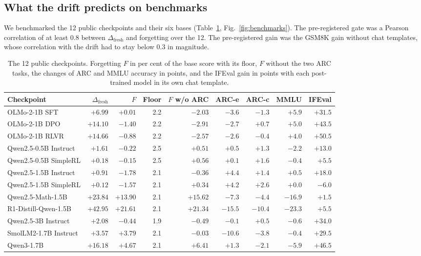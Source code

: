 \documentclass[11pt,a4paper]{article}
\theoremstyle{definition}
\newcommand{\dfresh}{\Delta_{\mathrm{fresh}}}
\begin{document}
\subsection{What the drift predicts on benchmarks}
\label{sec:benchmarks}

We benchmarked the 12 public checkpoints and their six bases (Table~\ref{tab:benchmarks},
Fig.~\ref{fig:benchmarks}). The pre-registered gate was a Pearson correlation of at least 0.8 between $\dfresh$
and forgetting over the 12. The pre-registered gain was the GSM8K gain without chat templates, whose correlation
with the drift had to stay below 0.3 in magnitude.

\begin{table}[ht]
\centering\small
\caption{The 12 public checkpoints. Forgetting $F$ in per cent of the base score with its floor, $F$ without the
two ARC tasks, the changes of ARC and MMLU accuracy in points, and the IFEval gain in points with each
post-trained model in its own chat template.}
\label{tab:benchmarks}
\begin{tabular}{@{}l r r r r r r r r@{}}
\toprule
Checkpoint & $\dfresh$ & $F$ & Floor & $F$ w/o ARC & ARC-e & ARC-c & MMLU & IFEval \\
\midrule
OLMo-2-1B SFT & $+6.99$ & $+0.01$ & 2.2 & $-2.03$ & $-3.6$ & $-1.3$ & $+5.9$ & $+31.5$ \\
OLMo-2-1B DPO & $+14.10$ & $-1.40$ & 2.2 & $-2.91$ & $-2.7$ & $+0.7$ & $+5.0$ & $+43.5$ \\
OLMo-2-1B RLVR & $+14.66$ & $-0.88$ & 2.2 & $-2.57$ & $-2.6$ & $-0.4$ & $+4.0$ & $+50.5$ \\
Qwen2.5-0.5B Instruct & $+1.61$ & $-0.22$ & 2.5 & $+0.51$ & $+0.5$ & $+1.3$ & $-2.2$ & $+13.0$ \\
Qwen2.5-0.5B SimpleRL & $+0.18$ & $-0.15$ & 2.5 & $+0.56$ & $+0.1$ & $+1.6$ & $-0.4$ & $+5.5$ \\
Qwen2.5-1.5B Instruct & $+0.91$ & $-1.78$ & 2.1 & $-0.36$ & $+4.4$ & $+1.4$ & $+0.5$ & $+18.0$ \\
Qwen2.5-1.5B SimpleRL & $+0.12$ & $-1.57$ & 2.1 & $+0.34$ & $+4.2$ & $+2.6$ & $+0.0$ & $-6.0$ \\
Qwen2.5-Math-1.5B & $+23.84$ & $+13.90$ & 2.1 & $+15.62$ & $-7.3$ & $-4.4$ & $-16.9$ & $+1.5$ \\
R1-Distill-Qwen-1.5B & $+42.95$ & $+21.61$ & 2.1 & $+21.34$ & $-15.5$ & $-10.4$ & $-23.3$ & $+5.5$ \\
Qwen2.5-3B Instruct & $+2.08$ & $-0.44$ & 1.9 & $-0.49$ & $-0.1$ & $+0.5$ & $-0.6$ & $+34.0$ \\
SmolLM2-1.7B Instruct & $+3.57$ & $+3.79$ & 2.1 & $-0.03$ & $-10.6$ & $-3.8$ & $-0.4$ & $+29.5$ \\
Qwen3-1.7B & $+16.18$ & $+4.67$ & 2.1 & $+6.41$ & $+1.3$ & $-2.1$ & $-5.9$ & $+46.5$ \\
\bottomrule
\end{tabular}
\end{table}
\end{document}
